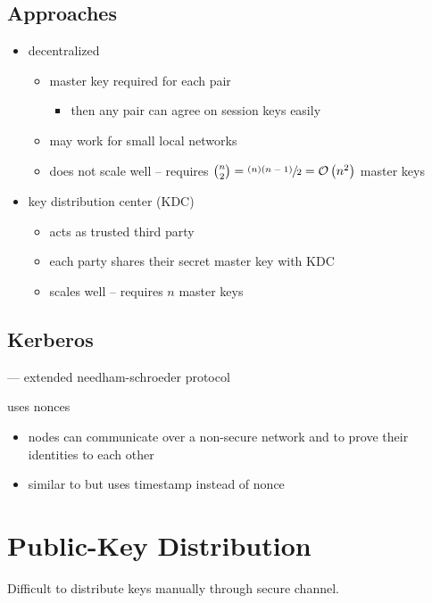 \documentclass[draft]{article}
\begin{document}
\subsection{Approaches}
\begin{itemize}[nosep]
    \item decentralized
          \begin{itemize}[nosep]
              \item master key required for each pair
                    \begin{itemize}[nosep]\item then any pair can agree on session keys easily\end{itemize}
              \item may work for small local networks
              \item does not scale well -- requires $\binom{n}{2} = \sfrac{(n)(n-1)}{2} = \mathcal{O}\left(n^2\right)$ master keys
          \end{itemize}
    \item key distribution center (KDC)
          \   \begin{itemize}[nosep]
              \item acts as trusted third party
              \item each party shares their secret master key with KDC
              \item scales well -- requires $n$ master keys
          \end{itemize}
\end{itemize}
\subsection{Kerberos}
 --- \glsdesc{extended needham-schroeder protocol}

uses nonces

\begin{itemize}[nosep]
    \item nodes can communicate over a non-secure network and to prove their identities to each other
    \item similar to  but uses timestamp instead of nonce
\end{itemize}
\section{Public-Key Distribution}
Difficult to distribute keys manually through secure channel.
\end{document}
